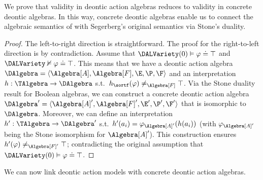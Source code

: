 We prove that validity in deontic action algebras reduces to validity in concrete deontic algebras.
In this way, concrete deontic algebras enable us to connect the algebraic semantics of \DAL with Segerberg's original semantics via Stone's duality.


\medskip
{}
\begin{proof}
	The left-to-right direction is straightforward.
	The proof for the right-to-left direction is by contradiction.
	Assume that $\DALVariety(0) \vDash \varphi \doteq \top$ and $\DALVariety \nvDash \varphi \doteq \top$.
	This means that we have a deontic action algebra $\DAlgebra = \langle \Algebra[A], \Algebra[F],  \E, \P, \F \rangle$ and an interpretation $h: \TAlgebra \to \DAlgebra$ s.t.\ $h_{\sortf}(\varphi) \neq_{\Algebra[F]} \top$.
	Via the Stone duality result for Boolean algebras, we can construct a concrete deontic action algebra $\DAlgebra' = \langle \Algebra[A]', \Algebra[F]',  \E', \P', \F' \rangle$ that is isomorphic to $\DAlgebra$.
	Moreover, we can define an interpretation $h': \TAlgebra \to \DAlgebra'$ s.t.\ $h'(a_i) = \varphi_{\Algebra[A]'}(h(a_i))$ (with  $\varphi_{\Algebra[A]'}$ being the Stone isomorphism for $\Algebra[A]'$).
	This construction ensures $h'(\varphi) \neq_{\Algebra[F]'} \top$; contradicting the original assumption that $\DALVariety(0) \vDash \varphi \doteq \top$.
\end{proof}

We can now link deontic action models with concrete deontic action algebras.


\medskip
{}
\medskip

